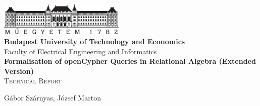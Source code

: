 \begin{titlepage}
	\begin{center}
		\includegraphics[width=60mm,keepaspectratio]{figures/bme-logo}\\
		\vspace{0.3cm}
		\textbf{Budapest University of Technology and Economics}\\
		\textmd{Faculty of Electrical Engineering and Informatics}\\[5cm]

		\vspace{0.4cm}
		{\huge \bfseries Formalisation of openCypher Queries in Relational Algebra (Extended Version)}\\[0.8cm]
		\vspace{0.5cm}
		\textsc{\Large Technical Report}
		
		\vfill

		{\Large Gábor Szárnyas, József Marton}\\


		\\[1cm]

	\end{center}
\end{titlepage}

\addtocounter{page}{1}
